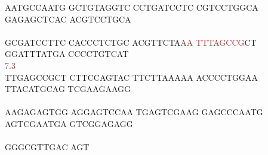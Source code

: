 \documentclass[11pt,twoside,reqno,a4paper]{article}
\begin{document}
{AATGCCAATG	GCTGTAGGTC	CCTGATCCTC	CGTCCTGGCA	GAGAGCTCAC	ACGTCCTGCA	\\
\hspace*{1\charwidth}\hspace*{1\charwidth}\hspace*{1\charwidth}\hspace*{1\charwidth}\hspace*{1\charwidth}\hspace*{1\charwidth}\\
GCGATCCTTC	CACCCTCTGC	ACGTTCTA\textcolor{Brown}{A}\textcolor{Brown}{A}	\textcolor{Brown}{T}\textcolor{Brown}{T}\textcolor{Brown}{T}\textcolor{Brown}{A}\textcolor{Brown}{G}\textcolor{Brown}{C}\textcolor{Brown}{C}\textcolor{Brown}{G}CT	GGATTTATGA	CCCCTGTCAT	\\
\hspace*{1\charwidth}\hspace*{1\charwidth}\hspace*{28\charwidth}\textcolor{Brown}{7.3}\hspace*{1\charwidth}\hspace*{1\charwidth}\hspace*{1\charwidth}\\
TTGAGCCGCT	CTTCCAGTAC	TTCTTAAAAA	ACCCCTGGAA	TTACATGCAG	TCGAAGAAGG	\\
\hspace*{1\charwidth}\hspace*{1\charwidth}\hspace*{1\charwidth}\hspace*{1\charwidth}\hspace*{1\charwidth}\hspace*{1\charwidth}\\
AAGAGAGTGG	AGGAGTCCAA	TGAGTCGAAG	GAGCCCAATG	AGTCGAATGA	GTCGGAGAGG	\\
\hspace*{1\charwidth}\hspace*{1\charwidth}\hspace*{1\charwidth}\hspace*{1\charwidth}\hspace*{1\charwidth}\hspace*{1\charwidth}\\
GGGCGTTGAC	AGT\\
\hspace*{1\charwidth}\\
\\
\\
\\
\\
}
\end{document}
